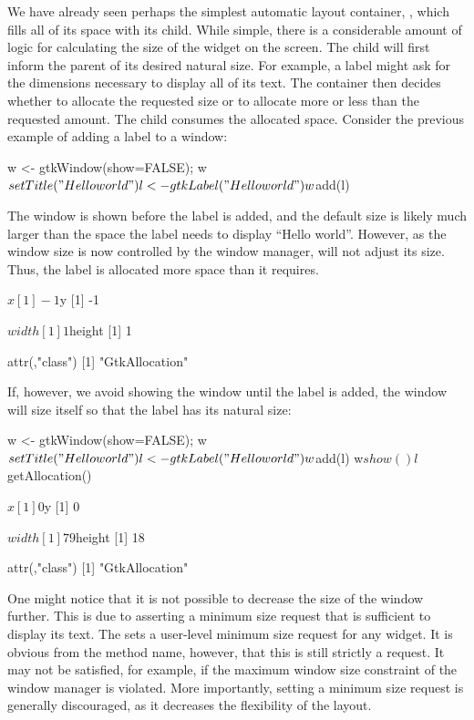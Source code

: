 We have already seen perhaps the simplest automatic layout container,
, which fills all of its space with its child. While
simple, there is a considerable amount of logic for calculating the
size of the widget on the screen. The child will first inform the
parent of its desired natural size. For example, a label might ask for
the dimensions necessary to display all of its text. The container
then decides whether to allocate the requested size or to allocate
more or less than the requested amount. The child consumes the
allocated space. Consider the previous example of adding a label to a
window:
\begin{Schunk}
\begin{Sinput}
 w <- gtkWindow(show=FALSE); w$setTitle("Hello world")
 l <- gtkLabel("Hello world")
 w$add(l)
\end{Sinput}
\end{Schunk}
%
The window is shown before the label is added, and the default size is
likely much larger than the space the label needs to display ``Hello
world''. However, as the window size is now controlled by the window
manager,  will not adjust its size. Thus, the label
is allocated more space than it requires.
\begin{Schunk}
\begin{Soutput}
$x
[1] -1

$y
[1] -1

$width
[1] 1

$height
[1] 1

attr(,"class")
[1] "GtkAllocation"
\end{Soutput}
\end{Schunk}
%
If, however, we avoid showing the window until the label is added, the
window will size itself so that the label has its natural size:
\begin{Schunk}
\begin{Sinput}
 w <- gtkWindow(show=FALSE); w$setTitle("Hello world")
 l <- gtkLabel("Hello world")
 w$add(l)
 w$show()
 l$getAllocation()
\end{Sinput}
\begin{Soutput}
$x
[1] 0

$y
[1] 0

$width
[1] 79

$height
[1] 18

attr(,"class")
[1] "GtkAllocation"
\end{Soutput}
\end{Schunk}
%
One might notice that it is not possible to decrease the size of the
window further. This is due to  asserting a minimum
size request that is sufficient to display its text. The
 sets a user-level minimum size 
request for any widget. It is obvious from the method name, however,
that this is still strictly a request. It may not be satisfied, for
example, if the maximum window size constraint of the window manager
is violated. More importantly, setting a minimum size request is
generally discouraged, as it decreases the flexibility of the layout.

